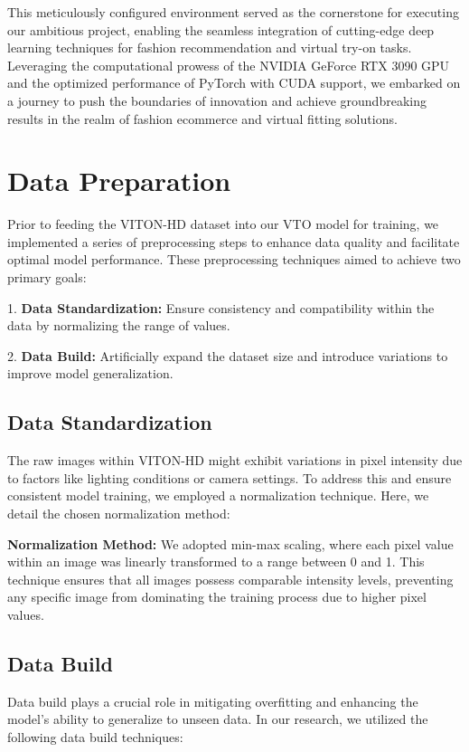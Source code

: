 This meticulously configured environment served as the cornerstone for executing our ambitious project, enabling the seamless integration of cutting-edge deep learning techniques for fashion recommendation and virtual try-on tasks. Leveraging the computational prowess of the NVIDIA GeForce RTX 3090 GPU and the optimized performance of PyTorch with CUDA support, we embarked on a journey to push the boundaries of innovation and achieve groundbreaking results in the realm of fashion ecommerce and virtual fitting solutions.

\section{Data Preparation}

Prior to feeding the VITON-HD dataset into our VTO model for training, we implemented a series of preprocessing steps to enhance data quality and facilitate optimal model performance. These preprocessing techniques aimed to achieve two primary goals:

1. \textbf{Data Standardization:} Ensure consistency and compatibility within the data by normalizing the range of values.

2. \textbf{Data Build:} Artificially expand the dataset size and introduce variations to improve model generalization.

\subsection{Data Standardization}

The raw images within VITON-HD might exhibit variations in pixel intensity due to factors like lighting conditions or camera settings. To address this and ensure consistent model training, we employed a normalization technique. Here, we detail the chosen normalization method:

\textbf{Normalization Method:} We adopted min-max scaling, where each pixel value within an image was linearly transformed to a range between 0 and 1. This technique ensures that all images possess comparable intensity levels, preventing any specific image from dominating the training process due to higher pixel values.

\subsection{Data Build}

Data build plays a crucial role in mitigating overfitting and enhancing the model's ability to generalize to unseen data. In our research, we utilized the following data build techniques:


